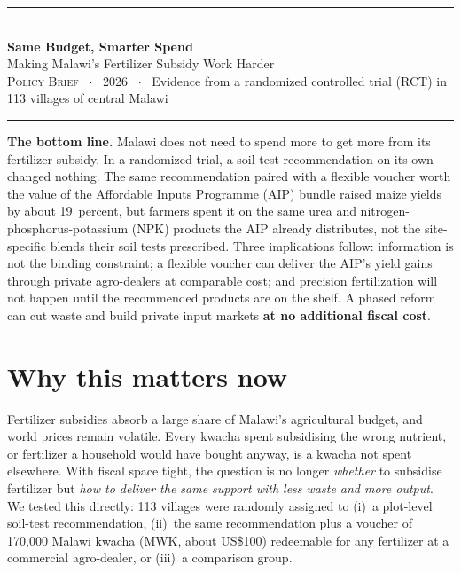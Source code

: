 \documentclass[10pt]{article}
\newcommand{\callout}[1]{%
  \begin{center}\colorbox{brandlt}{\parbox{0.955\textwidth}{\vspace{3pt}#1\vspace{3pt}}}\end{center}}
\begin{document}
{\color{brand}\rule{\textwidth}{2.5pt}}\\[2pt]
{\LARGE\bfseries Same Budget, Smarter Spend}\\[2pt]
{\large\color{brand} Making Malawi's Fertilizer Subsidy Work Harder}\\[3pt]
{\footnotesize\textsc{Policy Brief} \, $\cdot$ \, 2026 \, $\cdot$ \, Evidence from a randomized controlled trial (RCT) in 113 villages of central Malawi}\\[-4pt]
{\color{brand}\rule{\textwidth}{0.6pt}}

\callout{%
\textbf{The bottom line.} Malawi does not need to spend more to get more from its fertilizer subsidy. In a randomized trial, a soil-test recommendation on its own changed nothing. The same recommendation paired with a flexible voucher worth the value of the Affordable Inputs Programme (AIP) bundle raised maize yields by about 19~percent, but farmers spent it on the same urea and nitrogen-phosphorus-potassium (NPK) products the AIP already distributes, not the site-specific blends their soil tests prescribed. Three implications follow: information is not the binding constraint; a flexible voucher can deliver the AIP's yield gains through private agro-dealers at comparable cost; and precision fertilization will not happen until the recommended products are on the shelf. A phased reform can cut waste and build private input markets \textbf{at no additional fiscal cost}.}

\section{Why this matters now}
Fertilizer subsidies absorb a large share of Malawi's agricultural budget, and world prices remain volatile. Every kwacha spent subsidising the wrong nutrient, or fertilizer a household would have bought anyway, is a kwacha not spent elsewhere. With fiscal space tight, the question is no longer \emph{whether} to subsidise fertilizer but \emph{how to deliver the same support with less waste and more output}. We tested this directly: 113 villages were randomly assigned to (i)~a plot-level soil-test recommendation, (ii)~the same recommendation plus a voucher of 170{,}000 Malawi kwacha (MWK, about US\$100) redeemable for any fertilizer at a commercial agro-dealer, or (iii)~a comparison group.
\end{document}
